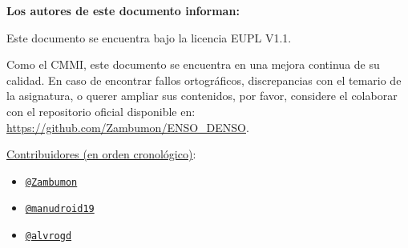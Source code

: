 \vspace*{\fill}
\begin{center}
    \textbf{Los autores de este documento informan:}\\
\end{center}
\vspace*{0.6em}
\begin{center}
    Este documento se encuentra bajo la licencia EUPL V1.1.\\
\end{center}
\begin{center}
    Como el CMMI, este documento se encuentra en una mejora continua de su calidad. En caso de encontrar
    fallos ortográficos, discrepancias con el temario de la asignatura, o querer ampliar sus contenidos, por favor, considere el colaborar con el repositorio oficial disponible en:
    \url{https://github.com/Zambumon/ENSO_DENSO}.
\end{center}
\vspace*{0.6em}
\begin{center}
    \uline{Contribuidores (en orden cronológico)}:\\
    \begin{itemize}
        \item[] \hspace{2.33in}\href{https://github.com/Zambumon}{\texttt{@Zambumon}}
        \item[] \hspace{2.23in}\href{https://github.com/manudroid19}{\texttt{@manudroid19}}
        \item[] \hspace{2.385in}\href{https://github.com/alvrogd}{\texttt{@alvrogd}}
    \end{itemize}
\end{center}
\vspace*{\fill}
